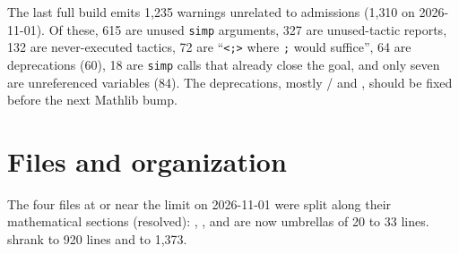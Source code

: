 \documentclass[11pt,a4paper]{article}
\begin{document}
The last full build emits 1{,}235 warnings unrelated to admissions (1{,}310 on 2026-11-01). Of
these, 615 are unused \texttt{simp} arguments, 327 are unused-tactic reports, 132 are
never-executed tactics, 72 are ``\texttt{<;>} where \texttt{;} would suffice'', 64 are
deprecations (60), 18 are \texttt{simp} calls that already close the goal, and only seven are
unreferenced variables (84). The deprecations, mostly / and
, should be fixed before the next Mathlib bump.

\section{Files and organization}\label{sec:files}

The four files at or near the limit on 2026-11-01 were split along their mathematical sections
(resolved): , ,
 and  are now
umbrellas of 20 to 33 lines.  shrank to 920 lines and
 to 1{,}373.
\end{document}
